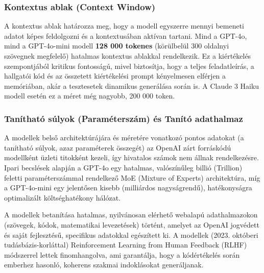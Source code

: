 \documentclass[12pt,a4paper]{article}
\begin{document}
\subsubsection*{Kontextus ablak (Context Window)}
A kontextus ablak határozza meg, hogy a modell egyszerre mennyi bemeneti adatot képes feldolgozni és a kontextusában aktívan tartani. Mind a GPT-4o, mind a GPT-4o-mini modell \textbf{128 000 tokenes} (körülbelül 300 oldalnyi szövegnek megfelelő) hatalmas kontextus ablakkal rendelkezik. Ez a kiértékelés szempontjából kritikus fontosságú, mivel biztosítja, hogy a teljes feladatleírás, a hallgatói kód és az összetett kiértékelési prompt kényelmesen elférjen a memóriában, akár a tesztesetek dinamikus generálása során is. A Claude 3 Haiku modell esetén ez a méret még nagyobb, 200 000 token.

\subsubsection*{Tanítható súlyok (Paraméterszám) és Tanító adathalmaz}
A modellek belső architektúrájára és méretére vonatkozó pontos adatokat (a tanítható súlyok, azaz paraméterek összegét) az OpenAI zárt forráskódú modellként üzleti titokként kezeli, így hivatalos számok nem állnak rendelkezésre. Ipari becslések alapján a GPT-4o egy hatalmas, valószínűleg billió (Trillion) feletti paraméterszámmal rendelkező MoE (Mixture of Experts) architektúra, míg a GPT-4o-mini egy jelentősen kisebb (milliárdos nagyságrendű), hatékonyságra optimalizált költséghatékony hálózat. 

A modellek betanítása hatalmas, nyilvánosan elérhető webalapú adathalmazokon (szövegek, kódok, matematikai levezetések) történt, amelyet az OpenAI jogvédett és saját fejlesztésű, specifikus adatokkal egészített ki. A modellek (2023. októberi tudásbázis-korláttal) Reinforcement Learning from Human Feedback (RLHF) módszerrel lettek finomhangolva, ami garantálja, hogy a kódértékelés során emberhez hasonló, koherens szakmai indoklásokat generáljanak.
\end{document}
